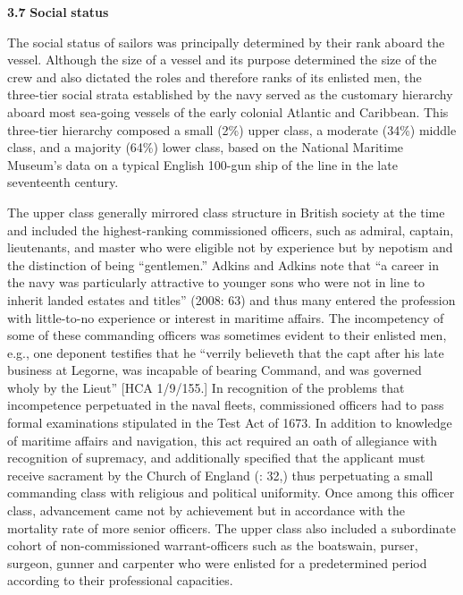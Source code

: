 \textbf{3.7} \textbf{Social} \textbf{status}

  The social status of sailors was principally determined by their rank aboard the vessel. Although the size of a vessel and its purpose determined the size of the crew and also dictated the roles and therefore ranks of its enlisted men, the three-tier social strata established by the navy served as the customary hierarchy aboard most sea-going vessels of the early colonial Atlantic and Caribbean. This three-tier hierarchy composed a small (2\%) upper class, a moderate (34\%) middle class, and a majority (64\%) lower class, based on the National Maritime Museum’s data on a typical English 100-gun ship of the line in the late seventeenth century. 

The upper class generally mirrored class structure in British society at the time and included the highest-ranking commissioned officers, such as admiral, captain, lieutenants, and master who were eligible not by experience but by nepotism and the distinction of being “gentlemen.” Adkins and Adkins note that “a career in the navy was particularly attractive to younger sons who were not in line to inherit landed estates and titles” (2008: 63) and thus many entered the profession with little-to-no experience or interest in maritime affairs. The incompetency of some of these commanding officers was sometimes evident to their enlisted men, e.g., one deponent testifies that he “verrily believeth that the capt after his late business at Legorne, was incapable of bearing Command, and was governed wholy by the Lieut” [HCA 1/9/155.] In recognition of the problems that incompetence perpetuated in the naval fleets, commissioned officers had to pass formal examinations stipulated in the Test Act of 1673. In addition to knowledge of maritime affairs and navigation, this act required an oath of allegiance with recognition of supremacy, and additionally specified that the applicant must receive sacrament by the Church of England (\citealt{AdkinsAdkins2008}: 32,) thus perpetuating a small commanding class with religious and political uniformity. Once among this officer class, advancement came not by achievement but in accordance with the mortality rate of more senior officers. The upper class also included a subordinate cohort of non-commissioned warrant-officers such as the boatswain, purser, surgeon, gunner and carpenter who were enlisted for a predetermined period according to their professional capacities.  

